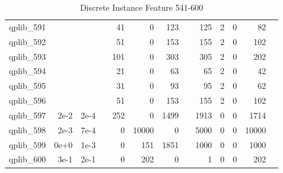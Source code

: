 \begin{table}
\begin{tabular}{lrrrrrrrrrrrr}
qplib\_591	&		&		&	&	41	&	0	&	123	&	&	125	&	2	&	0	&	82	\\
qplib\_592	&		&		&	&	51	&	0	&	153	&	&	155	&	2	&	0	&	102	\\
qplib\_593	&		&		&	&	101	&	0	&	303	&	&	305	&	2	&	0	&	202	\\
qplib\_594	&		&		&	&	21	&	0	&	63	&	&	65	&	2	&	0	&	42	\\
qplib\_595	&		&		&	&	31	&	0	&	93	&	&	95	&	2	&	0	&	62	\\
qplib\_596	&		&		&	&	51	&	0	&	153	&	&	155	&	2	&	0	&	102	\\
qplib\_597	&	2e-2	&	2e-4	&	&	252	&	0	&	1499	&	&	1913	&	0	&	0	&	1714	\\
qplib\_598	&	2e-3	&	7e-4	&	&	0	&	10000	&	0	&	&	5000	&	0	&	0	&	10000	\\
qplib\_599	&	0e+0	&	1e-3	&	&	0	&	151	&	1851	&	&	1000	&	0	&	0	&	1000	\\
qplib\_600	&	3e-1	&	2e-1	&	&	0	&	202	&	0	&	&	1	&	0	&	0	&	202	\\
														


\bottomrule

\end{tabular}  
\label{tab:A10}
\caption{Discrete  Instance Feature 541-600} 

\end{table}




